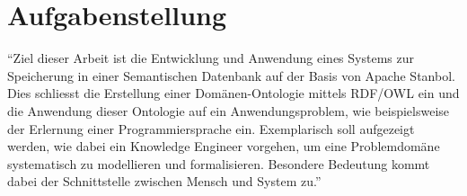 \chapter{Aufgabenstellung}
\label{chap:Aufgabenstellung}


"`Ziel dieser Arbeit ist die Entwicklung und Anwendung eines Systems zur Speicherung in einer Semantischen Datenbank auf der Basis von Apache Stanbol. Dies schliesst die Erstellung einer Domänen-Ontologie mittels RDF/OWL ein und die Anwendung dieser Ontologie auf ein Anwendungsproblem, wie beispielsweise der Erlernung einer Programmiersprache ein. Exemplarisch soll aufgezeigt werden, wie dabei ein Knowledge Engineer vorgehen, um eine Problemdomäne systematisch zu modellieren und formalisieren. Besondere Bedeutung kommt dabei der Schnittstelle zwischen Mensch und System zu."'~\cite{Aufgabenstellung}

